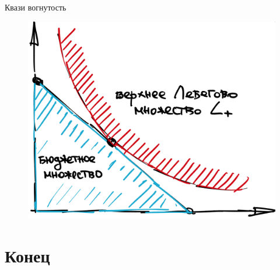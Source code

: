 \documentclass{beamer}
\begin{document}
\begin{frame}{Квази вогнутость}

\begin{figure}[hbt]
\centering
\includegraphics[width=.8 \textwidth]{tangency.png}
\end{figure}

\end{frame}

\section{Конец}
\end{document}
